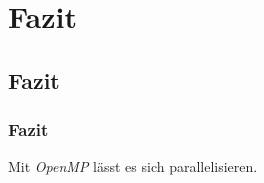 \documentclass[german,notes,18pt]{beamer}
\begin{document}
	\section{Fazit}
	\subsection{Fazit}
	\begin{frame}
		\frametitle{Fazit}
		
		\LARGE
		\centering
		Mit \emph{OpenMP} lässt es sich parallelisieren.
	\end{frame}
\end{document}
